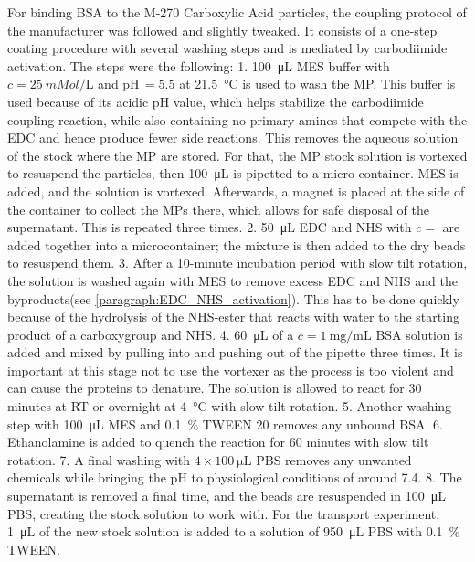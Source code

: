 For binding \ac{BSA} to the M-270 Carboxylic Acid particles, the coupling protocol of the manufacturer was followed and slightly tweaked.
It consists of a one-step coating procedure with several washing steps and is mediated by carbodiimide activation.
The steps were the following:
1. \SI{100}{\micro\L} \ac{MES} buffer with $c=\SI{25}{mMol\per\L}$ and pH$\,=5.5$ at \SI{21.5}{\celsius} is used to wash the \ac{MP}.
This buffer is used because of its acidic pH value, which helps stabilize the carbodiimide coupling reaction\cite{Fischer2010}, while also containing no primary amines that compete with the \ac{EDC} and hence produce fewer side reactions. 
This removes the aqueous solution of the stock where the \ac{MP} are stored.
For that, the \ac{MP} stock solution is vortexed to resuspend the particles, then \SI{100}{\micro\L} is pipetted to a micro container.
\ac{MES} is added, and the solution is vortexed.
Afterwards, a magnet is placed at the side of the container to collect the \acp{MP} there, which allows for safe disposal of the supernatant.
This is repeated three times.
2. \SI{50}{\micro\L} \ac{EDC} and \ac{NHS} with $c=$ are added together into a microcontainer; the mixture is then added to the dry beads to resuspend them. 
3. After a 10-minute incubation period with slow tilt rotation, the solution is washed again with \ac{MES} to remove excess \ac{EDC} and \ac{NHS} and the byproducts(see \ref{paragraph:EDC_NHS_activation}).
This has to be done quickly because of the hydrolysis of the \ac{NHS}-ester that reacts with water to the starting product of a carboxygroup and \ac{NHS}. 
4. \SI{60}{\micro\L} of a $c=\SI{1}{\milli\g\per\milli\L}$ \ac{BSA} solution is added and mixed by pulling into and pushing out of the pipette three times.
It is important at this stage not to use the vortexer as the process is too violent and can cause the proteins to denature.
The solution is allowed to react for 30 minutes at \ac{RT} or overnight at \SI{4}{\celsius} with slow tilt rotation.
5. Another washing step with \SI{100}{\micro\L} \ac{MES} and \SI{0.1}{\percent} TWEEN 20 removes any unbound \ac{BSA}.
6. Ethanolamine is added to quench the reaction for 60 minutes with slow tilt rotation.
7. A final washing with $4\times\SI{100}{\micro\L}$ \ac{PBS} removes any unwanted chemicals while bringing the pH to physiological conditions of around 7.4.
8. The supernatant is removed a final time, and the beads are resuspended in \SI{100}{\micro\L} \ac{PBS}, creating the stock solution to work with.
For the transport experiment, \SI{1}{\micro\L} of the new stock solution is added to a solution of \SI{950}{\micro\L} \ac{PBS} with \SI{0.1}{\percent} TWEEN.